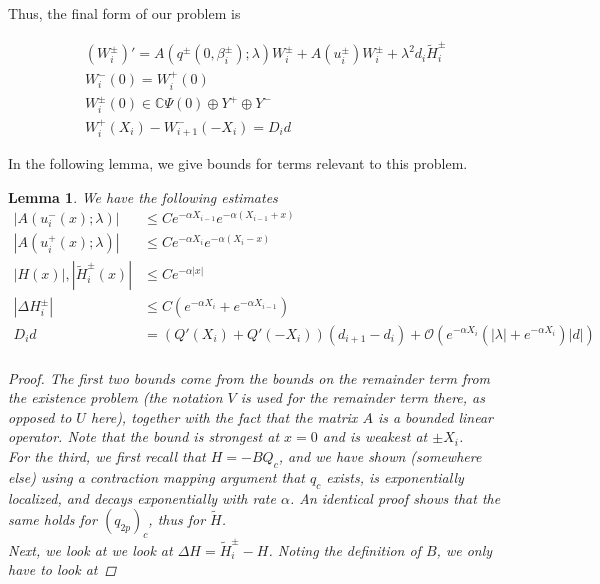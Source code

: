 \documentclass[12pt]{article}
\def\C{{\mathbb C}}
\newtheorem{lemma}{Lemma}
\begin{document}
Thus, the final form of our problem is

\begin{align}
&(W_i^\pm)' = A(q^\pm(0, \beta_i^\pm); \lambda) W_i^\pm + A(u_i^\pm) W_i^\pm + \lambda^2 d_i \tilde{H}_i^\pm \\
&W_i^-(0) = W_i^+(0) \\
&W_i^\pm(0) \in \C \Psi(0) \oplus Y^+ \oplus Y^- \\
&W_i^+(X_i) - W_{i+1}^-(-X_i) = D_i d
\end{align}

In the following lemma, we give bounds for terms relevant to this problem.


\begin{lemma}\label{problembounds}
We have the following estimates
\begin{align*}
|A(u_i^-(x); \lambda)| &\leq C e^{-\alpha X_{i-1}} e^{-\alpha(X_{i-1} + x) } \\
|A(u_i^+(x); \lambda)| &\leq C e^{-\alpha X_i} e^{-\alpha(X_i - x) } \\
|H(x)|, |\tilde{H}_i^\pm(x)| &\leq C e^{-\alpha |x|} \\
|\Delta H_i^\pm| &\leq C(e^{-\alpha X_i} + e^{-\alpha X_{i-1}} ) \\
D_i d &= ( Q'(X_i) + Q'(-X_i))(d_{i+1} - d_i ) + \mathcal{O} \left( e^{-\alpha X_i} \left( |\lambda| +  e^{-\alpha X_i}  \right) |d| \right) \\
\end{align*}

\begin{proof}
The first two bounds come from the bounds on the remainder term from the existence problem (the notation $V$ is used for the remainder term there, as opposed to $U$ here), together with the fact that the matrix $A$ is a bounded linear operator. Note that the bound is strongest at $x = 0$ and is weakest at $\pm X_i$. \\

For the third, we first recall that $H = -B Q_c$, and we have shown (somewhere else) using a contraction mapping argument that $q_c$ exists, is exponentially localized, and decays exponentially with rate $\alpha$. An identical proof shows that the same holds for $(q_{2p})_c$, thus for $\tilde{H}$.\\
 
Next, we look at we look at $\Delta H = \tilde{H}_i^\pm - H$. Noting the definition of $B$, we only have to look at 


\end{proof}
\end{lemma}
\end{document}
